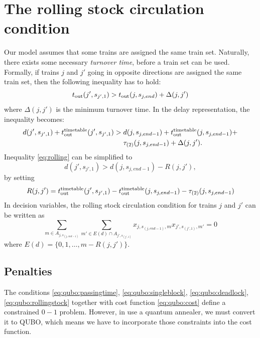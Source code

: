 \section{The rolling stock circulation condition}
Our model assumes that some trains are assigned the same train set. Naturally, there exists some necessary \emph{turnover time}, before a train set can be used. Formally, if trains $j$ and $j'$ going in opposite
directions are assigned the same train set, then the following inequality has to hold:
\begin{equation}
  t_\text{out}(j', s_{j',1}) > t_\text{out}(j, s_{j,end}) + \Delta(j, j')
\end{equation}
where $\Delta(j, j')$ is the minimum turnover time. In the delay
representation, the inequality becomes:
\begin{equation}
  \label{eq:rolling}
  \begin{split}
    d(j',s_{j',1}) + t_\text{out}^\text{timetable}(j',s_{j',1}) > & \; d(j, s_{j,end-1}) + t_\text{out}^\text{timetable}(j, s_{j,end-1}) + \\
    & \; \tau_{(2)}(j, s_{j,end-1}) + \Delta(j,j').
  \end{split}
\end{equation}
Inequality \eqref{eq:rolling} can be simplified to
\begin{equation}
  d(j',s_{j',1}) > d(j, s_{j,end-1}) - R(j,j'),
\end{equation}
by setting
\begin{equation}
  \label{eq:rolling2}
  R(j, j') = t_\text{out}^\text{timetable}(j',s_{j',1}) - t_\text{out}^\text{timetable}(j, s_{j,end-1}) - \tau_{(2)}(j,s_{j,end-1})
\end{equation}
In decision variables, the rolling stock circulation condition for trains $j$ and $j'$ can
be written as
\begin{equation}
  \label{eq:qubo:rollingstock}
  \sum_{m \in A_{j, s_{(j, end-1)}}} \sum_{m' \in E(d) \cap A_{j',s_{(j',1)}}} x_{j,s_{(j,end-1)},m}x_{j', s_{(j',1)},m'} = 0
\end{equation}
where $E(d) = \{0, 1, \ldots, m-R(j, j')\}$.

\subsection{Penalties}
The conditions \eqref{eq:qubo:passingtime}, \eqref{eq:qubo:singleblock}, \eqref{eq:qubo:deadlock}, \eqref{eq:qubo:rollingstock} together with cost function \eqref{eq:qubo:cost} define a constrained $0-1$ problem.
However, in use a quantum annealer, we must convert it to QUBO, which means we have to incorporate those constraints
into the cost function.

